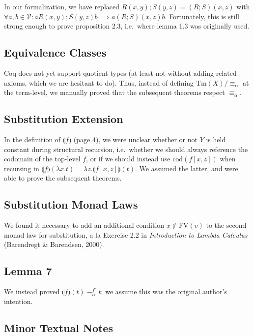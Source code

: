 \documentclass{article}
\begin{document}
In our formalization, we have replaced $R(x,y); S(y,z) = (R;S)(x,z)$ with $\forall a, b \in
\mathcal{V} : a R(x,y); S(y,z) b \implies a (R;S)(x,z) b$. Fortunately, this is still strong enough
to prove proposition 2.3, i.e.\ where lemma 1.3 was originally used.

\subsection{Equivalence Classes}

Coq does not yet support quotient types (at least not without adding related axioms, which we are
hesitant to do). Thus, instead of defining $\textrm{Tm}(X)/\equiv_\alpha$ at the term-level, we
manually proved that the subsequent theorems respect $\equiv_\alpha$.

\subsection{Substitution Extension}

In the definition of $\llparenthesis f \rrparenthesis$ (page 4), we were unclear whether or not $Y$
is held constant during structural recursion, i.e.\ whether we should always reference the codomain
of the top-level $f$, or if we should instead use $\textrm{cod}(f[x,z])$ when recursing in
$\llparenthesis f \rrparenthesis(\lambda x. t) = \lambda z. \llparenthesis f[x,z] \rrparenthesis
(t)$. We assumed the latter, and were able to prove the subsequent theorems.

\subsection{Substitution Monad Laws}

We found it necessary to add an additional condition $x \notin \textrm{FV}(v)$ to the second monad
law for substitution, a la Exercise 2.2 in \emph{Introduction to Lambda Calculus} (Barendregt \&
Barendsen, 2000).

\subsection{Lemma 7}

We instead proved $\llparenthesis f \rrparenthesis (t) \equiv_\alpha^{f^\circ} t$; we assume this
was the original author's intention.

\subsection{Minor Textual Notes}
\end{document}
